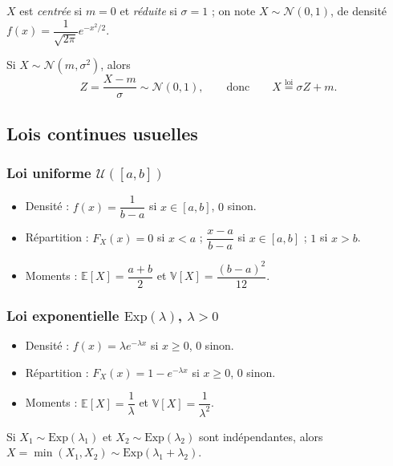 \documentclass[11pt,a4paper]{article}
\newcommand{\E}{\mathbb{E}}
\newcommand{\V}{\mathbb{V}}
\newcommand{\1}{\mathbf{1}}
\begin{document}
\begin{definition}
$X$ est \emph{centrée} si $m=0$ et \emph{réduite} si $\sigma=1$ ; on note $X\sim\mathcal{N}(0,1)$, de densité $f(x)=\dfrac{1}{\sqrt{2\pi}}e^{-x^2/2}$.
\end{definition}

\begin{proposition}
Si $X\sim\mathcal{N}(m,\sigma^2)$, alors
\[
Z=\frac{X-m}{\sigma}\sim\mathcal{N}(0,1),\qquad\text{donc}\qquad X\overset{\text{loi}}{=}\sigma Z+m.
\]
\end{proposition}

\subsection{Lois continues usuelles}

\subsubsection*{Loi uniforme $\mathcal{U}([a,b])$}

\begin{itemize}
  \item Densité : $f(x)=\dfrac{1}{b-a}$ si $x\in[a,b]$, $0$ sinon.
  \item Répartition : $F_X(x)=0$ si $x<a$ ; $\dfrac{x-a}{b-a}$ si $x\in[a,b]$ ; $1$ si $x>b$.
  \item Moments : $\E[X]=\dfrac{a+b}{2}$ et $\V[X]=\dfrac{(b-a)^2}{12}$.
\end{itemize}

\subsubsection*{Loi exponentielle $\mathrm{Exp}(\lambda)$, $\lambda>0$}

\begin{itemize}
  \item Densité : $f(x)=\lambda e^{-\lambda x}$ si $x\ge0$, $0$ sinon.
  \item Répartition : $F_X(x)=1-e^{-\lambda x}$ si $x\ge0$, $0$ sinon.
  \item Moments : $\E[X]=\dfrac1\lambda$ et $\V[X]=\dfrac1{\lambda^2}$.
\end{itemize}

\begin{proposition}
Si $X_1\sim\mathrm{Exp}(\lambda_1)$ et $X_2\sim\mathrm{Exp}(\lambda_2)$ sont indépendantes, alors $X=\min(X_1,X_2)\sim\mathrm{Exp}(\lambda_1+\lambda_2)$.
\end{proposition}
\end{document}
